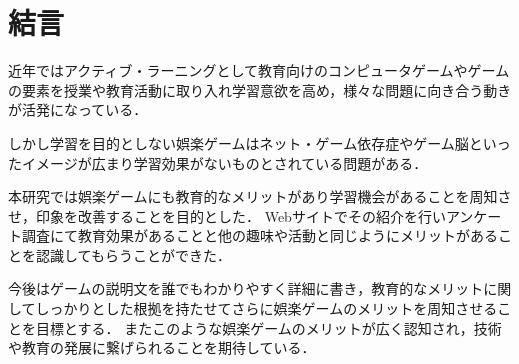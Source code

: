 \section{結言}
近年ではアクティブ・ラーニングとして教育向けのコンピュータゲームやゲームの要素を授業や教育活動に取り入れ学習意欲を高め，様々な問題に向き合う動きが活発になっている．

しかし学習を目的としない娯楽ゲームはネット・ゲーム依存症やゲーム脳といったイメージが広まり学習効果がないものとされている問題がある．

本研究では娯楽ゲームにも教育的なメリットがあり学習機会があることを周知させ，印象を改善することを目的とした．
Webサイトでその紹介を行いアンケート調査にて教育効果があることと他の趣味や活動と同じようにメリットがあることを認識してもらうことができた．

今後はゲームの説明文を誰でもわかりやすく詳細に書き，教育的なメリットに関してしっかりとした根拠を持たせてさらに娯楽ゲームのメリットを周知させることを目標とする．
またこのような娯楽ゲームのメリットが広く認知され，技術や教育の発展に繋げられることを期待している．